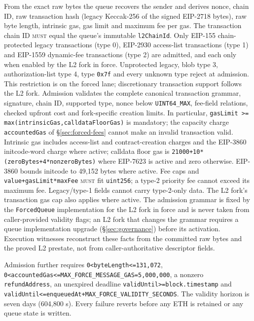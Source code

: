 \documentclass[a4paper,11pt]{article}
\newcommand{\code}[1]{\nolinkurl{#1}}
\newcommand{\must}{\textsc{must}}
\begin{document}
From the exact raw bytes the queue recovers the sender and derives nonce,
chain ID, raw transaction hash (legacy Keccak-256 of the signed EIP-2718
bytes), raw byte length, intrinsic gas, gas limit and maximum fee per gas.
The transaction chain ID \must{} equal the queue's immutable \code{l2ChainId}.
Only EIP-155 chain-protected legacy transactions (type 0), EIP-2930
access-list transactions (type 1) and EIP-1559 dynamic-fee transactions
(type 2) are admitted, and each only when enabled by the L2 fork in force.
Unprotected legacy, blob type 3, authorization-list type 4, type \code{0x7f}
and every unknown type reject at admission.  This restriction is on the
forced lane; discretionary transaction support follows the L2 fork.
Admission validates the complete canonical transaction grammar, signature,
chain ID, supported type, nonce below \code{UINT64_MAX}, fee-field relations,
checked upfront cost and fork-specific creation limits.  In particular,
\code{gasLimit >= max(intrinsicGas,calldataFloorGas)} is mandatory; the
capacity charge \code{accountedGas} of \S\ref{sec:forced-fees} cannot make an
invalid transaction valid.  Intrinsic gas includes access-list and
contract-creation charges and the EIP-3860 initcode-word charge where active;
calldata floor gas is \code{21000+10*(zeroBytes+4*nonzeroBytes)} where
EIP-7623 is active and zero otherwise.  EIP-3860 bounds initcode to 49,152
bytes where active.  Fee caps and \code{value+gasLimit*maxFee} \must{} fit
\code{uint256}; a type-2 priority fee cannot exceed its maximum fee.
Legacy/type-1 fields cannot carry type-2-only data.  The L2 fork's
transaction gas cap also applies where active.  The admission grammar is
fixed by the \code{ForcedQueue} implementation for the L2 fork in force and
is never taken from caller-provided validity flags; an L2 fork that changes
the grammar requires a queue implementation upgrade (\S\ref{sec:governance})
before its activation.  Execution witnesses reconstruct these facts from the
committed raw bytes and the proved L2 prestate, not from caller-authoritative
descriptor fields.

Admission further requires \code{0<byteLength<=131,072},
\code{0<accountedGas<=MAX_FORCE_MESSAGE_GAS=5,000,000}, a nonzero
\code{refundAddress}, an unexpired deadline
\code{validUntil>=block.timestamp} and
\code{validUntil<=enqueuedAt+MAX_FORCE_VALIDITY_SECONDS}.  The validity
horizon is seven days (604,800 s).  Every failure reverts before any ETH is
retained or any queue state is written.
\end{document}
